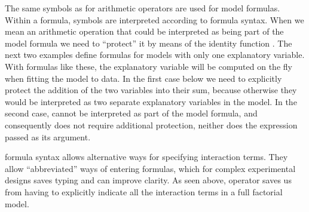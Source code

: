 \documentclass[krantz2]{krantz}\usepackage{knitr}
\begin{document}
The same symbols as for arithmetic operators are used for model formulas. Within a formula, symbols are interpreted according to formula syntax. When we mean an arithmetic operation that could be interpreted as being part of the model formula we need to ``protect'' it by means of the identity function . The next two examples define formulas for models with only one explanatory variable. With formulas like these, the explanatory variable will be computed on the fly when fitting the model to data. In the first case below we need to explicitly protect the addition of the two variables into their sum, because otherwise they would be interpreted as two separate explanatory variables in the model. In the second case,  cannot be interpreted as part of the model formula, and consequently does not require additional protection, neither does the expression passed as its argument.

\begin{knitrout}\footnotesize
{}\color{fgcolor}\begin{kframe}
\begin{alltt}
 \hlopt{~}  \hlopt{+} 
 \hlopt{~}  \hlopt{+} 
\end{alltt}
\end{kframe}
\end{knitrout}

\Rlang formula syntax allows alternative ways for specifying interaction terms. They allow ``abbreviated'' ways of entering formulas, which for complex experimental designs saves typing and can improve clarity. As seen above, operator \code{*} saves us from having to explicitly indicate all the interaction terms in a full factorial model.

\begin{knitrout}\footnotesize
{}\color{fgcolor}\begin{kframe}
\begin{alltt}
 \hlopt{~}  \hlopt{+}  \hlopt{+}  \hlopt{+} \hlopt{:} \hlopt{+} \hlopt{:} \hlopt{+} \hlopt{:} \hlopt{+} \hlopt{:}\hlopt{:}
\end{alltt}
\end{kframe}
\end{knitrout}
\end{document}

